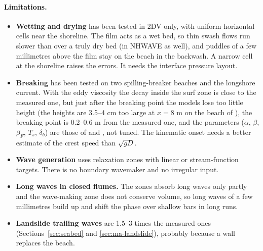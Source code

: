 \paragraph{Limitations.}
\begin{itemize}[nosep]
  \item \textbf{Wetting and drying} has been tested in 2DV only, with uniform
        horizontal cells near the shoreline. The film acts as a wet bed, so
        thin swash flows run slower than over a truly dry bed (in NHWAVE as
        well), and puddles of a few millimetres above the film stay on the
        beach in the backwash. A narrow cell at the shoreline raises the
        errors. It needs the interface pressure layout.
  \item \textbf{Breaking} has been tested on two spilling-breaker beaches
        and the longshore current. With the eddy viscosity the decay inside
        the surf zone is close to the measured one, but just after the
        breaking point the models lose too little height (the heights are
        3.5--4 cm too large at $x = 8$ m on the beach of \citet{ting1994}),
        the breaking point is 0.2--0.6 m from the measured one, and the
        parameters
        ($\alpha$, $\beta$, $\beta_F$, $T_s$, $\delta_b$) are those of
        \citet{smit2013} and \citet{kennedy2000}, not tuned. The kinematic
        onset needs a better estimate of the crest speed than $\sqrt{gD}$.
  \item \textbf{Wave generation} uses relaxation zones with linear or
        stream-function targets. There is no boundary wavemaker and no
        irregular input.
  \item \textbf{Long waves in closed flumes.} The zones absorb long waves only
        partly and the wave-making zone does not conserve volume, so long waves
        of a few millimetres build up and shift the phase over shallow bars in
        long runs.
  \item \textbf{Landslide trailing waves} are 1.5--3 times the measured ones
        (Sections~\ref{sec:seabed} and \ref{sec:ma-landslide}), probably
        because a wall replaces the beach.
\end{itemize}

